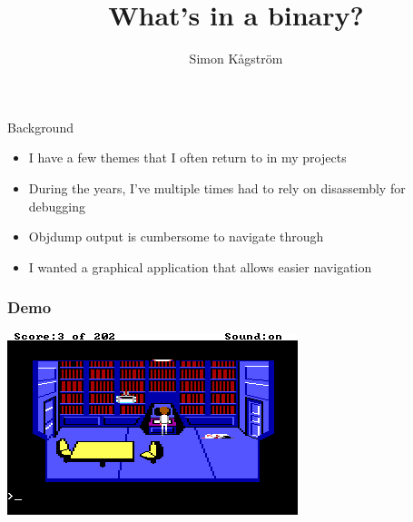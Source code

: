 \documentclass{beamer}
\title[What's in a binary?] %
{What's in a binary?}
\author{Simon Kågström}
\institute
{
  Consultant\\
  \texttt{https://github.com/SimonKagstrom/emilpro}
}
\begin{document}
\begin{frame}
  \titlepage
\end{frame}


\begin{frame}{Background}
  \begin{itemize}
    \item I have a few themes that I often return to in my projects
    \item During the years, I've multiple times had to rely on disassembly for debugging
    \item Objdump output is cumbersome to navigate through
    \item<2> I wanted a graphical application that allows easier navigation
  \end{itemize}
\end{frame}


\begin{frame}
  \frametitle{Demo}

  \includegraphics[width=\linewidth]{sq_keypad}
\end{frame}
\end{document}
